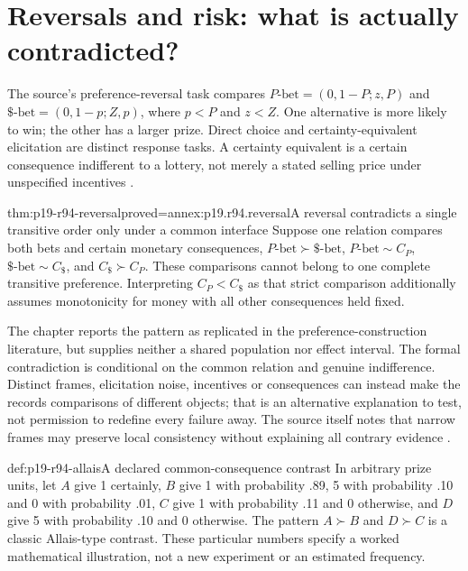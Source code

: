 \section{Reversals and risk: what is actually contradicted?}
\label{sec:p19-r94-reversals}

The source's preference-reversal task compares
\(P\text{-bet}=(0,1-P;z,P)\) and
\(\$\text{-bet}=(0,1-p;Z,p)\), where \(p<P\) and \(z<Z\).
One alternative is more likely to win; the other has a larger prize.
Direct choice and certainty-equivalent elicitation are distinct response
tasks. A certainty equivalent is a certain consequence indifferent to a
lottery, not merely a stated selling price under unspecified incentives
\cite[p.~570, note~5]{DhamiAlNowaihi2021Economics}.

\begin{hbtheorem}{thm:p19-r94-reversal}{proved=annex:p19.r94.reversal}{A reversal contradicts a single transitive order only under a common interface}
Suppose one relation compares both bets and certain monetary consequences,
\(P\text{-bet}\succ\$\text{-bet}\),
\(P\text{-bet}\sim C_P\), \(\$\text{-bet}\sim C_{\$}\), and
\(C_{\$}\succ C_P\). These comparisons cannot belong to one
complete transitive preference. Interpreting \(C_P<C_{\$}\) as that
strict comparison additionally assumes monotonicity for money with all
other consequences held fixed.
\end{hbtheorem}

The chapter reports the pattern as replicated in the preference-construction
literature, but supplies neither a shared population nor effect interval.
The formal contradiction is conditional on the common relation and genuine
indifference. Distinct frames, elicitation noise, incentives or consequences
can instead make the records comparisons of different objects; that is an
alternative explanation to test, not permission to redefine every failure
away. The source itself notes that narrow frames may preserve local
consistency without explaining all contrary evidence
\cite[p.~570]{DhamiAlNowaihi2021Economics}.

\begin{hbexample}{def:p19-r94-allais}{A declared common-consequence contrast}
In arbitrary prize units, let \(A\) give 1 certainly, \(B\) give
1 with probability .89, 5 with probability .10 and 0 with probability .01,
\(C\) give 1 with probability .11 and 0 otherwise, and \(D\) give
5 with probability .10 and 0 otherwise. The pattern \(A\succ B\)
and \(D\succ C\) is a classic Allais-type contrast. These particular
numbers specify a worked mathematical illustration, not a new experiment
or an estimated frequency.
\end{hbexample}

